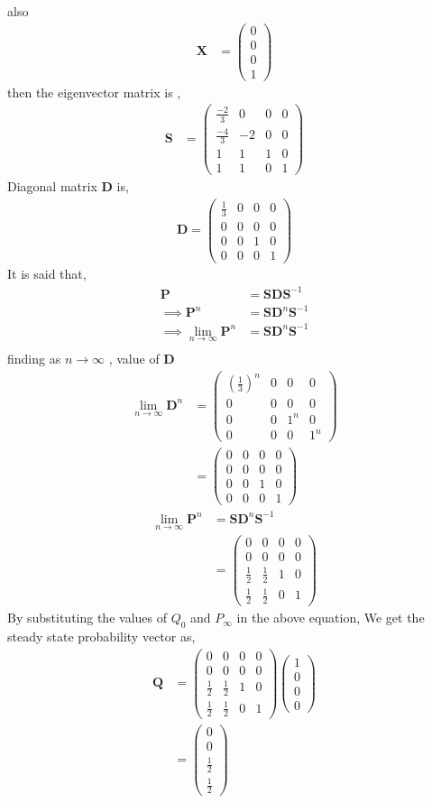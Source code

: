 \documentclass[journal,12pt,two column]{IEEEtran}
\providecommand{\brak}[1]{\ensuremath{\left(#1\right)}}
\newcommand{\myvec}[1]{\ensuremath{\begin{pmatrix}#1\end{pmatrix}}}
\let\vec\mathbf
\begin{document}
also
\begin{align}
	\vec{X}&=\myvec{0\\0\\0\\1}
\end{align}
then the eigenvector matrix is ,
\begin{align}
	\vec{S}&=\myvec{\frac{-2}{3}&0&0&0\\
	\frac{-4}{3}&-2&0&0\\
	1&1&1&0\\
	1&1&0&1}
\end{align}
Diagonal matrix $\vec{D}$ is,
\begin{align}
	\vec{D}=\myvec{\frac{1}{3}&0&0&0\\
	0&0&0&0\\
	0&0&1&0\\
	0&0&0&1}
\end{align} 
It is said that,
\begin{align}
	\vec{P}&=\vec{S}\vec{D}\vec{S}^{-1}\\
	\implies \vec{P}^n&=\vec{S}\vec{D}^n \vec{S}^{-1}\\
	\implies \lim_{n \to \infty} \vec{P}^n&=\vec{S} \vec{D}^n \vec{S}^{-1}\\
\end{align}
finding as $n \to \infty$ , value of $\vec{D}$
\begin{align}
	\lim_{n \to \infty} \vec{D}^n&=\myvec{\brak{\frac{1}{3}}^n &0&0&0\\
	0&0&0&0\\
	0&0&1^n&0\\
	0&0&0&1^n}\\
	&=\myvec{0&0&0&0\\
	0&0&0&0\\
	0&0&1&0\\
	0&0&0&1}
\end{align}
\begin{align}	
	\lim _{n \to \infty}\vec{P}^n&=\vec{S}\vec{D}^n \vec{S}^{-1}\\
	&=\myvec{0&0&0&0\\0&0&0&0\\\frac{1}{2}&\frac{1}{2}&1&0\\ \frac{1}{2}&\frac{1}{2} &0&1}
\end{align}
By substituting the values of $Q_0$ and $P_\infty$ in the above equation, We get the steady state probability vector as,
\begin{align}
    \vec{Q}&=\myvec{0&0&0&0\\0&0&0&0\\\frac{1}{2}&\frac{1}{2}&1&0\\\frac{1}{2}&\frac{1}{2}&0&1}\myvec{1\\0\\0\\0}\\
    &=\myvec{0\\0\\\frac{1}{2}\\\frac{1}{2}}
\end{align}
\end{document}
